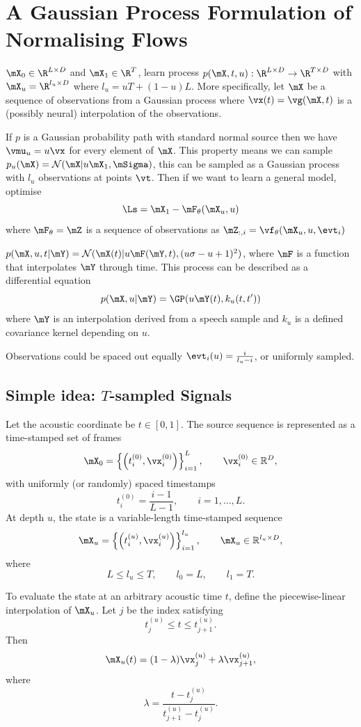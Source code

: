 \section{A Gaussian Process Formulation of Normalising Flows}
$\mX_0\in\R^{L\times D}$ and $\mX_1\in\R^{T}$, learn process $p(\mX, t, u) : \R^{L\times D}\rightarrow\R^{T\times D}$ with $\mX_u=\R^{l_u\times D}$ where $l_u=uT+(1-u)L$. More specifically, let $\mX$ be a sequence of observations from a Gaussian process where $\vx(t)=\vg(\mX, t)$ is a (possibly neural) interpolation of the observations.

If $p$ is a Gaussian probability path with standard normal source then we have $\vmu_u=u\vx$ for every element of $\mX$. This property means we can sample $p_u(\mX)=\mathcal{N}(\mX|u\mX_1,\mSigma)$, this can be sampled as a Gaussian process with $l_u$ observations at points $\vt$. Then if we want to learn a general model, optimise
\[
\Ls=\mX_1 - \mF_\theta(\mX_u,u)
\]
where $\mF_\theta=\mZ$ is a sequence of observations as $\mZ_{:,i}=\vf_\theta(\mX_u, u, \evt_i)$

$p(\mX,u,t|\mY)=\mathcal{N}(\mX(t)|u\mF(\mY,t),(u\sigma-u+1)^2)$, where $\mF$ is a function that interpolates $\mY$ through time. This process can be described as a differential equation
\[
p(\mX,u|\mY)=\GP(u\mY(t),k_u(t,t'))
\]
where $\mY$ is an interpolation derived from a speech sample and $k_u$ is a defined covariance kernel depending on $u$.



Observations could be spaced out equally $\evt_i(u)=\frac{i}{l_u-i}$, or uniformly sampled.

\subsection{Simple idea: $T$-sampled Signals}

Let the acoustic coordinate be $t \in [0,1]$. The source sequence is
represented as a time-stamped set of frames
\[
\mX_0
=
\left\{
\left(t_i^{(0)}, \vx_i^{(0)}\right)
\right\}_{i=1}^{L},
\qquad
\vx_i^{(0)} \in \mathbb{R}^{D},
\]
with uniformly (or randomly) spaced timestamps
\[
t_i^{(0)}
=
\frac{i-1}{L-1},
\qquad
i=1,\dots,L.
\]
At depth $u$, the state is a variable-length time-stamped sequence
\[
\mX_u
=
\left\{
\left(t_i^{(u)}, \vx_i^{(u)}\right)
\right\}_{i=1}^{l_u},
\qquad
\mX_u \in \mathbb{R}^{l_u \times D},
\]
where
\[
L \leq l_u \leq T,
\qquad
l_0 = L,
\qquad
l_1 = T.
\]

To evaluate the state at an arbitrary acoustic time $t$, define the
piecewise-linear interpolation of $\mX_u$. Let $j$ be the index satisfying
\[
t_j^{(u)} \leq t \leq t_{j+1}^{(u)}.
\]
Then
\[
\mX_u(t)
=
(1-\lambda)\vx_j^{(u)}
+
\lambda \vx_{j+1}^{(u)},
\]
where
\[
\lambda
=
\frac{
t - t_j^{(u)}
}{
t_{j+1}^{(u)} - t_j^{(u)}
}.
\]

